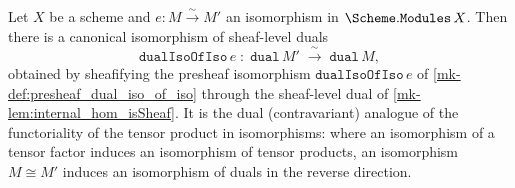 \begin{definition}\label{mk-def:scheme_modules_dual_iso_of_iso}
  \leanok

  Let \(X\) be a scheme and \(e : M \xrightarrow{\sim} M'\) an isomorphism in
  \(\Scheme.\mathtt{Modules}\,X\). Then there is a canonical isomorphism of sheaf-level
  duals
  \[
    \mathtt{dualIsoOfIso}\,e \;\colon\; \mathtt{dual}\,M' \;\xrightarrow{\ \sim\ }\;
      \mathtt{dual}\,M,
  \]
  obtained by sheafifying the presheaf isomorphism \(\mathtt{dualIsoOfIso}\,e\) of
  \ref{mk-def:presheaf_dual_iso_of_iso} through the sheaf-level dual of
  \ref{mk-lem:internal_hom_isSheaf}. It is the dual (contravariant) analogue of the
  functoriality of the tensor product in isomorphisms: where an isomorphism of a tensor
  factor induces an isomorphism of tensor products, an isomorphism \(M \cong M'\)
  induces an isomorphism of duals in the reverse direction.
\end{definition}

